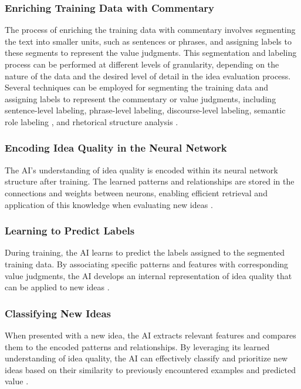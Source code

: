 \documentclass[conference]{article}
\begin{document}
	\subsubsection{Enriching Training Data with Commentary}
	
	The process of enriching the training data with commentary involves segmenting the text into smaller units, such as sentences or phrases, and assigning labels to these segments to represent the value judgments. This segmentation and labeling process can be performed at different levels of granularity, depending on the nature of the data and the desired level of detail in the idea evaluation process. Several techniques can be employed for segmenting the training data and assigning labels to represent the commentary or value judgments, including sentence-level labeling, phrase-level labeling, discourse-level labeling, semantic role labeling \cite{palmer2010semantic}, and rhetorical structure analysis \cite{mann1988rhetorical}.
	
	\subsubsection{Encoding Idea Quality in the Neural Network}
	
	The AI's understanding of idea quality is encoded within its neural network structure after training. The learned patterns and relationships are stored in the connections and weights between neurons, enabling efficient retrieval and application of this knowledge when evaluating new ideas \cite{bengio2013representation, lecun2015deep}.
	
	\subsubsection{Learning to Predict Labels}
	
	During training, the AI learns to predict the labels assigned to the segmented training data. By associating specific patterns and features with corresponding value judgments, the AI develops an internal representation of idea quality that can be applied to new ideas \cite{goodfellow2016deep, sutskever2014sequence}.
	
	\subsubsection{Classifying New Ideas}
	
	When presented with a new idea, the AI extracts relevant features and compares them to the encoded patterns and relationships. By leveraging its learned understanding of idea quality, the AI can effectively classify and prioritize new ideas based on their similarity to previously encountered examples and predicted value \cite{krizhevsky2012imagenet, mikolov2013efficient}.
	
\end{document}
